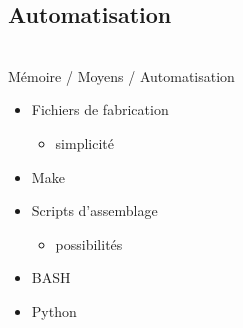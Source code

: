 \subsection{Automatisation}\begin{frame}
{\bititle\\Mémoire / Moyens / Automatisation}
\begin{multicols}{2}\begin{itemize}
\item<1-> Fichiers de fabrication\begin{itemize}
    \item<2-> simplicité
    \end{itemize}
\columnbreak
\item<3-> Make
\end{itemize}
\end{multicols}\begin{multicols}{2}
\begin{itemize}
\item<4-> Scripts d’assemblage\begin{itemize}
    \item<5-> possibilités
    \end{itemize}
\end{itemize}
\columnbreak
\begin{itemize}
\item<6-> BASH
\item<6-> Python
\end{itemize}\end{multicols}\end{frame}
